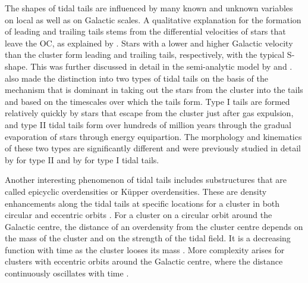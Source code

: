 \documentclass{aa}
\begin{document}
The shapes of tidal tails are influenced by many known and unknown variables on local as well as on Galactic scales. A qualitative explanation for the formation of leading and trailing tails stems from the differential velocities of stars that leave the OC, as explained by \citet{LectureNotesKroupa}. Stars with a lower and higher Galactic velocity than the cluster form leading and trailing tails, respectively, with the typical S-shape. This was further discussed in detail in the semi-analytic model by \citet{2020A&A...640A..84Dinnbier} and \citet{2021A&A...647A.137Jerabkova}. \citet{2020A&A...640A..84Dinnbier} also made the distinction into two types of tidal tails on the basis of the mechanism that is dominant in taking out the stars from the cluster into the tails and based on the timescales over which the tails form. Type I tails are formed relatively quickly by stars that escape from the cluster just after gas expulsion, and type II tidal tails form over hundreds of million years through the gradual evaporation of stars through energy equipartion. The morphology and kinematics of these two types are significantly different and were previously studied in detail by \citet{2008MNRAS.387.1248Kupper,2010MNRAS.401..105K} for type  II and by \citet{2020A&A...640A..84Dinnbier} for type I tidal tails.

Another interesting phenomenon of tidal tails includes substructures that are called epicyclic overdensities or K{\"u}pper overdensities. These are density enhancements along the tidal tails at specific locations for a cluster in both circular and eccentric orbits \citep{2008MNRAS.387.1248Kupper,2010MNRAS.401..105K,2009MNRAS.392..969Just}. For a cluster on a circular orbit around the Galactic centre, the distance of an overdensity from the cluster centre depends on the mass of the cluster and on the strength of the tidal field. It is a decreasing function with time as the cluster looses its mass \citep{2010MNRAS.401..105K}. More complexity arises for clusters with eccentric orbits around the Galactic centre, where the distance continuously oscillates with time \citep{2010MNRAS.401..105K}. 
\end{document}
